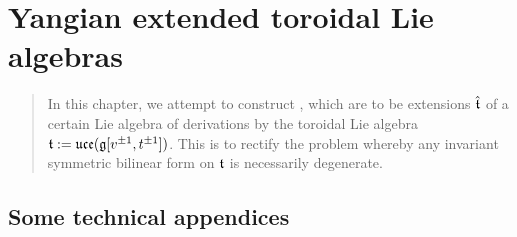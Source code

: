        

       

    \newpage

    \chapter{Yangian extended toroidal Lie algebras} \label{chapter: yangian_EALAs}
        \begin{abstract}
            In this chapter, we attempt to construct , which are to be extensions $\hat{\mathfrak{t}}$ of a certain Lie algebra of derivations by the toroidal Lie algebra $\mathfrak{t} := \mathfrak{uce}(\mathfrak{g}[v^{\pm 1}, t^{\pm 1}])$. This is to rectify the problem whereby any invariant symmetric bilinear form on $\mathfrak{t}$ is necessarily degenerate.
        \end{abstract}

        \minitoc
    
        

        

        

        

    \newpage

    \begin{appendices}
        \chapter{Some technical appendices}
            
    \end{appendices}

    \newpage

    \printbibliography

